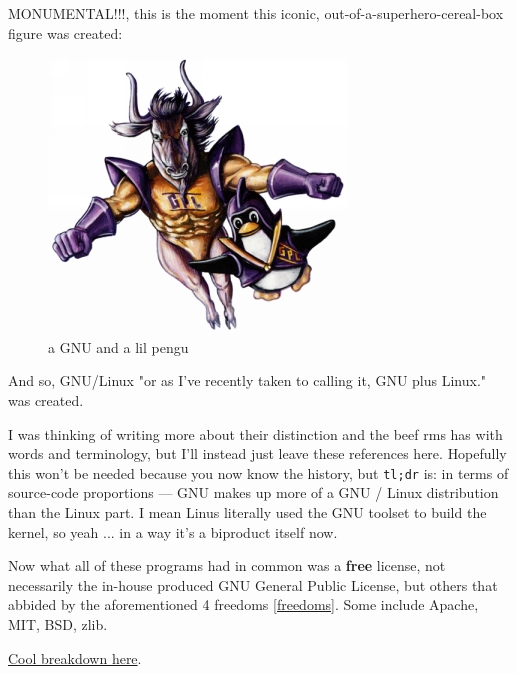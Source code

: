 \documentclass[sigplan,screen]{acmart}
\begin{document}
MONUMENTAL!!!, this is the moment this iconic, out-of-a-superhero-cereal-box figure was created:
\begin{figure}[H]
	\centering
	\includegraphics[width=\columnwidth]{pics/gnu-and-penguin.jpg}
	\caption{a GNU and a lil pengu}
	\label{fig:gnu-linux}
\end{figure}
And so, GNU/Linux "or as I've recently taken to calling it, GNU plus Linux." \cite{gnu-and-linux} was created.

I was thinking of writing more about their distinction and the beef rms has with words and terminology, but I'll instead just leave these references here. \cite{gnu-vs-linux-1} \cite{gnu-vs-linux-2} \cite{gnu-vs-linux-3} Hopefully this won't be needed because you now know the history, but \verb|tl;dr| is: in terms of source-code proportions — GNU makes up more of a GNU / Linux distribution than the Linux part. I mean Linus literally used the GNU toolset to build the kernel, so yeah ... in a way it's a biproduct itself now.

Now what all of these programs had in common was a \textbf{free} license, not necessarily the in-house produced GNU General Public License, but others that abbided by the aforementioned 4 freedoms \ref{freedoms}. Some include Apache, MIT, BSD, zlib.

\href{https://www.gnu.org/philosophy/categories.html}{Cool breakdown here}. \cite{free-categories}
\end{document}
